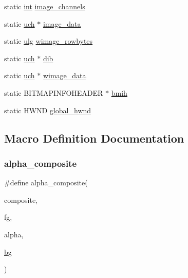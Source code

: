 \begin{DoxyCompactItemize}
\item 
static \mbox{\hyperlink{ioapi_8h_a787fa3cf048117ba7123753c1e74fcd6}{int}} \mbox{\hyperlink{rpng-win_8c_a11c512948875a4297d4b6fbac58d4594}{image\+\_\+channels}}
\item 
static \mbox{\hyperlink{readpng_8h_af3307af5922c72924a837559c801a8a4}{uch}} $\ast$ \mbox{\hyperlink{rpng-win_8c_ab11e4eabc5bd13b2fee5b43afa28cd64}{image\+\_\+data}}
\item 
static \mbox{\hyperlink{readpng_8h_abd6f60bf9450af2ecb94097a32c19a64}{ulg}} \mbox{\hyperlink{rpng-win_8c_a833a12713a1ba96549815e6be283c60d}{wimage\+\_\+rowbytes}}
\item 
static \mbox{\hyperlink{readpng_8h_af3307af5922c72924a837559c801a8a4}{uch}} $\ast$ \mbox{\hyperlink{rpng-win_8c_acdb146e25444af1717231691767569e6}{dib}}
\item 
static \mbox{\hyperlink{readpng_8h_af3307af5922c72924a837559c801a8a4}{uch}} $\ast$ \mbox{\hyperlink{rpng-win_8c_affd0519131c0b49596c378a425794a73}{wimage\+\_\+data}}
\item 
static B\+I\+T\+M\+A\+P\+I\+N\+F\+O\+H\+E\+A\+D\+ER $\ast$ \mbox{\hyperlink{rpng-win_8c_ae1b9f23932d01edb52ba2d35517d4964}{bmih}}
\item 
static H\+W\+ND \mbox{\hyperlink{rpng-win_8c_a94f16b99a35a2bd832ce3081c480746d}{global\+\_\+hwnd}}
\end{DoxyCompactItemize}


\subsection{Macro Definition Documentation}
\mbox{\label{rpng-win_8c_af1fe887e7346a25e71f3b1527e723692}} 
\subsubsection{\texorpdfstring{alpha\+\_\+composite}{alpha\_composite}}
{\footnotesize\ttfamily \#define alpha\+\_\+composite(\begin{DoxyParamCaption}\item[{}]{composite,  }\item[{}]{fg,  }\item[{}]{alpha,  }\item[{}]{\mbox{\hyperlink{rpng2-x_8c_a808fa6d3573a86afa3ba7698a65b1ef6}{bg}} }\end{DoxyParamCaption})}

